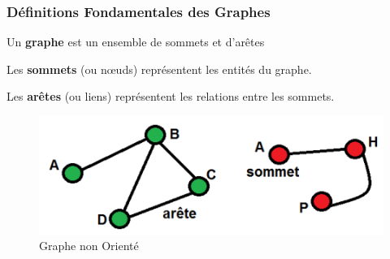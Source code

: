 \begin{frame}
\frametitle{Définitions Fondamentales des Graphes}

\begin{tcolorbox}[colback=orange!10,colframe=orange!100!black,
    title=Un Graphe]
    Un \textbf{graphe} est un ensemble de sommets et d'arêtes
\end{tcolorbox}

\begin{tcolorbox}[colback=orange!10,colframe=orange!100!black,
    title=Les Sommets]
    Les \textbf{sommets} (ou nœuds) représentent les entités du graphe.
\end{tcolorbox}


\begin{tcolorbox}[colback=orange!10,colframe=orange!100!black,
    title=Les Arêtes]
    Les \textbf{arêtes} (ou liens) représentent les relations entre les sommets.
\end{tcolorbox}

\begin{figure}[H]
    \centering
    \includegraphics[width=0.35 \textwidth]{Figures/graphes.PNG}
    \caption{Graphe non Orienté}
    \label{fig:Graphe , Sommets , Aretes}
\end{figure}

\end{frame}
